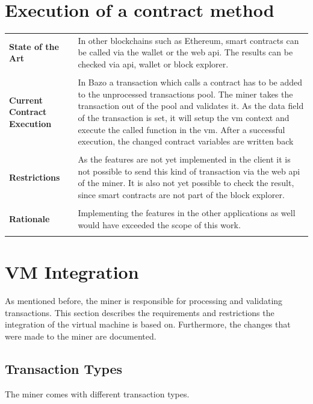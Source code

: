 \section{Execution of a contract method}
\begin{tabular}[t]{ p{3cm} p{12.5cm}}
\raggedright
\textbf{State of the Art} &
In other blockchains such as Ethereum, smart contracts can be called via the wallet or the web api. The results can be checked via api, wallet or block explorer. \\ \\
\raggedright
\textbf{Current Contract Execution} &
In Bazo a transaction which calls a contract has to be added to the unprocessed transactions pool. The miner takes the transaction out of the pool and validates it. As the data field of the transaction is set, it will setup the vm context and execute the called function in the vm. After a successful execution, the changed contract variables are written back \\ \\

\raggedright
\textbf{Restrictions} &
As the features are not yet implemented in the client it is not possible to send this kind of transaction via the web api of the miner. It is also not yet possible to check the result, since smart contracts are not part of the block explorer. \\ \\

\raggedright
\textbf{Rationale} &
Implementing the features in the other applications as well would have exceeded the scope of this work. \\ \\
\end{tabular}

\pagebreak

\section{VM Integration} \label{design_miner}
As mentioned before, the miner is responsible for processing and validating transactions. This section describes the requirements and restrictions the integration of the virtual machine is based on. Furthermore, the changes that were made to the miner are documented.

\subsection{Transaction Types} \label{transactionTypes}
The miner comes with different transaction types.

